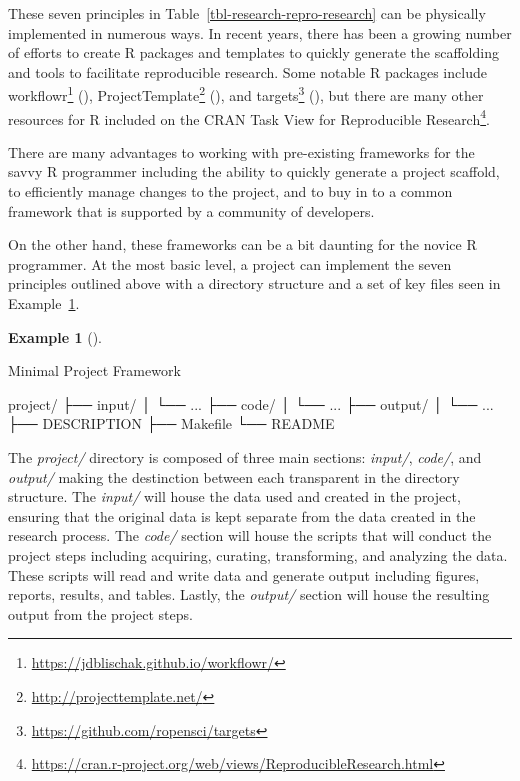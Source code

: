 \documentclass[
  letterpaper,
]{latex/krantz}
\newenvironment{Shaded}{\begin{snugshade}}{\end{snugshade}}
\newcommand{\ExtensionTok}[1]{\textcolor[rgb]{0.00,0.00,0.00}{#1}}
\newcommand{\NormalTok}[1]{\textcolor[rgb]{0.00,0.00,0.00}{#1}}
\theoremstyle{definition}
\newtheorem{example}{Example}[chapter]
\theoremstyle{remark}
\DeclareRobustCommand{\href}[2]{#2\footnote{\url{#1}}}
\begin{document}
These seven principles in Table~\ref{tbl-research-repro-research} can be
physically implemented in numerous ways. In recent years, there has been
a growing number of efforts to create R packages and templates to
quickly generate the scaffolding and tools to facilitate reproducible
research. Some notable R packages include
\href{https://jdblischak.github.io/workflowr/}{workflowr}
(),
\href{http://projecttemplate.net/}{ProjectTemplate}
(), and
\href{https://github.com/ropensci/targets}{targets}
(), but there are many other
resources for R included on the
\href{https://cran.r-project.org/web/views/ReproducibleResearch.html}{CRAN
Task View for Reproducible Research}.

There are many advantages to working with pre-existing frameworks for
the savvy R programmer including the ability to quickly generate a
project scaffold, to efficiently manage changes to the project, and to
buy in to a common framework that is supported by a community of
developers.

On the other hand, these frameworks can be a bit daunting for the novice
R programmer. At the most basic level, a project can implement the seven
principles outlined above with a directory structure and a set of key
files seen in Example~\ref{exm-research-basic-project}.

\begin{example}[]\protect\hypertarget{exm-research-basic-project}{}\label{exm-research-basic-project}

Minimal Project Framework

\begin{Shaded}
\begin{Highlighting}[]
\ExtensionTok{project/}
\ExtensionTok{├──}\NormalTok{ input/}
\ExtensionTok{│}\NormalTok{   └── ...}
\ExtensionTok{├──}\NormalTok{ code/}
\ExtensionTok{│}\NormalTok{   └── ...}
\ExtensionTok{├──}\NormalTok{ output/}
\ExtensionTok{│}\NormalTok{   └── ...}
\ExtensionTok{├──}\NormalTok{ DESCRIPTION}
\ExtensionTok{├──}\NormalTok{ Makefile}
\ExtensionTok{└──}\NormalTok{ README}
\end{Highlighting}
\end{Shaded}

\end{example}

The \emph{project/} directory is composed of three main sections:
\emph{input/}, \emph{code/}, and \emph{output/} making the destinction
between each transparent in the directory structure. The \emph{input/}
will house the data used and created in the project, ensuring that the
original data is kept separate from the data created in the research
process. The \emph{code/} section will house the scripts that will
conduct the project steps including acquiring, curating, transforming,
and analyzing the data. These scripts will read and write data and
generate output including figures, reports, results, and tables. Lastly,
the \emph{output/} section will house the resulting output from the
project steps.
\end{document}
